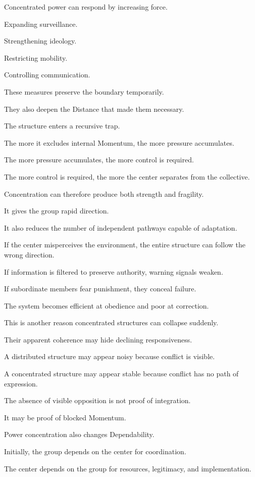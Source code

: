 Concentrated power can respond by increasing force.

Expanding surveillance.

Strengthening ideology.

Restricting mobility.

Controlling communication.

These measures preserve the boundary temporarily.

They also deepen the Distance that made them necessary.

The structure enters a recursive trap.

The more it excludes internal Momentum, the more pressure accumulates.

The more pressure accumulates, the more control is required.

The more control is required, the more the center separates from the collective.

Concentration can therefore produce both strength and fragility.

It gives the group rapid direction.

It also reduces the number of independent pathways capable of adaptation.

If the center misperceives the environment, the entire structure can follow the wrong direction.

If information is filtered to preserve authority, warning signals weaken.

If subordinate members fear punishment, they conceal failure.

The system becomes efficient at obedience and poor at correction.

This is another reason concentrated structures can collapse suddenly.

Their apparent coherence may hide declining responsiveness.

A distributed structure may appear noisy because conflict is visible.

A concentrated structure may appear stable because conflict has no path of expression.

The absence of visible opposition is not proof of integration.

It may be proof of blocked Momentum.

Power concentration also changes Dependability.

Initially, the group depends on the center for coordination.

The center depends on the group for resources, legitimacy, and implementation.

